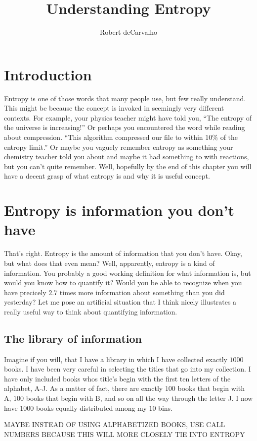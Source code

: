 \documentclass[11pt, oneside]{article}   	%
\title{Understanding Entropy}
\author{Robert deCarvalho}
\date{}							%
\begin{document}
\maketitle

\section{Introduction}
Entropy is one of those words that many people use, but few really understand.
This might be because the concept is invoked in seemingly very different
contexts.  For example, your physics teacher might have told you, ``The entropy
of the universe is increasing!'' Or perhaps you encountered the word while
reading about compression. ``This algorithm compressed our file to within
10\% of the entropy limit.''  Or maybe you vaguely remember entropy as something
your chemistry teacher told you about and maybe it had something to with
reactions, but you can't quite remember.  Well, hopefully by the end of this
chapter you will have a decent grasp of what entropy is and why it is useful
concept.


\section{Entropy is information you don't have}
That's right.  Entropy is the amount of information that you don't have.  Okay,
but what does that even mean?  Well, apparently, entropy is a kind of
information.  You probably a good working definition for what information is,
but would you know how to quantify it?  Would you be able to recognize when you
have precicely $2.7$ times more information about something than you did
yesterday?  Let me pose an artificial situation that I think nicely illustrates
a really useful way to think about quantifying information.

\subsection{The library of information}
Imagine if you will, that I have a library in which I have collected exactly
$1000$ books. I have been very careful in selecting the titles that go into my
collection. I have only included books whos title's begin with the first ten
letters of the alphabet, A-J. As a matter of fact, there are exactly $100$ books
that begin with A, $100$ books that begin with B, and so on all the way through
the letter J.  I now have $1000$ books equally distributed among my $10$ bins.

MAYBE INSTEAD OF USING ALPHABETIZED BOOKS, USE CALL NUMBERS BECAUSE THIS
WILL MORE CLOSELY TIE INTO ENTROPY
\end{document}
